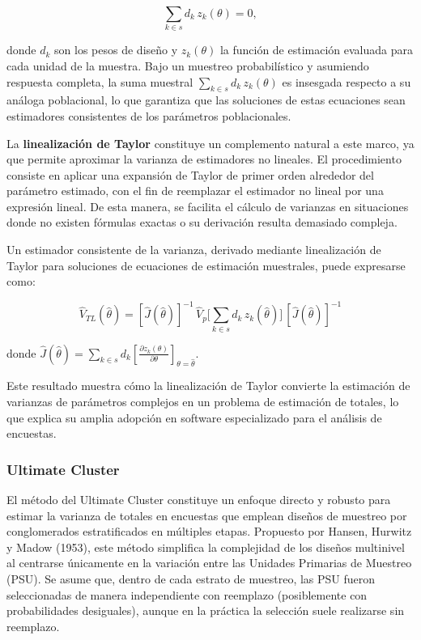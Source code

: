 \documentclass[
  12pt,
]{book}
\begin{document}
\[
\sum_{k\in s} d_k\, z_k(\theta)=0,
\]

donde \(d_k\) son los pesos de diseño y \(z_k(\theta)\) la función de estimación evaluada para cada unidad de la muestra. Bajo un muestreo probabilístico y asumiendo respuesta completa, la suma muestral \(\sum_{k\in s} d_k\, z_k(\theta)\) es insesgada respecto a su análoga poblacional, lo que garantiza que las soluciones de estas ecuaciones sean estimadores consistentes de los parámetros poblacionales.

La \textbf{linealización de Taylor} constituye un complemento natural a este marco, ya que permite aproximar la varianza de estimadores no lineales. El procedimiento consiste en aplicar una expansión de Taylor de primer orden alrededor del parámetro estimado, con el fin de reemplazar el estimador no lineal por una expresión lineal. De esta manera, se facilita el cálculo de varianzas en situaciones donde no existen fórmulas exactas o su derivación resulta demasiado compleja.

Un estimador consistente de la varianza, derivado mediante linealización de Taylor para soluciones de ecuaciones de estimación muestrales, puede expresarse como:

\[
\hat{V}_{TL}(\hat{\theta}) = [\hat{J}(\hat{\theta})]^{-1} \, \hat{V}_p \Bigg[\sum_{k\in s} d_k\, z_k(\hat{\theta})\Bigg] \, [\hat{J}(\hat{\theta})]^{-1}
\]

donde \(\hat{J}(\hat{\theta}) = \sum_{k\in s} d_k \left[ \frac{\partial z_k(\theta)}{\partial \theta} \right]_{\theta=\hat{\theta}}\).

Este resultado muestra cómo la linealización de Taylor convierte la estimación de varianzas de parámetros complejos en un problema de estimación de totales, lo que explica su amplia adopción en software especializado para el análisis de encuestas.

\subsubsection*{Ultimate Cluster}\label{ultimate-cluster}

El método del Ultimate Cluster constituye un enfoque directo y robusto para estimar la varianza de totales en encuestas que emplean diseños de muestreo por conglomerados estratificados en múltiples etapas. Propuesto por Hansen, Hurwitz y Madow (1953), este método simplifica la complejidad de los diseños multinivel al centrarse únicamente en la variación entre las Unidades Primarias de Muestreo (PSU). Se asume que, dentro de cada estrato de muestreo, las PSU fueron seleccionadas de manera independiente con reemplazo (posiblemente con probabilidades desiguales), aunque en la práctica la selección suele realizarse sin reemplazo.
\end{document}
